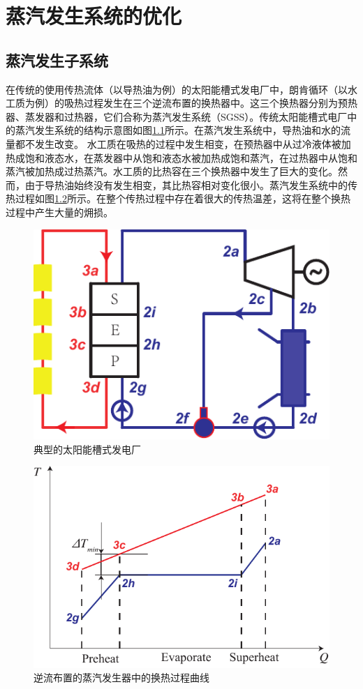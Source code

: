 \chapter{蒸汽发生系统的优化}
\label{cha:osgs}
\section{蒸汽发生子系统}

在传统的使用传热流体（以导热油为例）的太阳能槽式发电厂中，朗肯循环（以水工质为例）的吸热过程发生在三个逆流布置的换热器中。这三个换热器分别为预热器、蒸发器和过热器，它们合称为蒸汽发生系统（SGSS）。传统太阳能槽式电厂中的蒸汽发生系统的结构示意图如图\ref{fig:PTC}所示。在蒸汽发生系统中，导热油和水的流量都不发生改变。
水工质在吸热的过程中发生相变，在预热器中从过冷液体被加热成饱和液态水，在蒸发器中从饱和液态水被加热成饱和蒸汽，在过热器中从饱和蒸汽被加热成过热蒸汽。水工质的比热容在三个换热器中发生了巨大的变化。然而，由于导热油始终没有发生相变，其比热容相对变化很小。蒸汽发生系统中的传热过程如图\ref{fig:DeltaTmin}所示。在整个传热过程中存在着很大的传热温差，这将在整个换热过程中产生大量的㶲损。

\noindent \begin{figure}[htbp]
\begin{center}
	\includegraphics[width = 0.4\columnwidth]{fig/PTC}
	\caption{典型的太阳能槽式发电厂}
	\label{fig:PTC}
\end{center}
\end{figure}

\noindent \begin{figure}[htbp]
\begin{center}
	\includegraphics[width = 0.5\columnwidth]{fig/DeltaTmin}
	\caption{逆流布置的蒸汽发生器中的换热过程曲线}
	\label{fig:DeltaTmin}
\end{center}
\end{figure}

